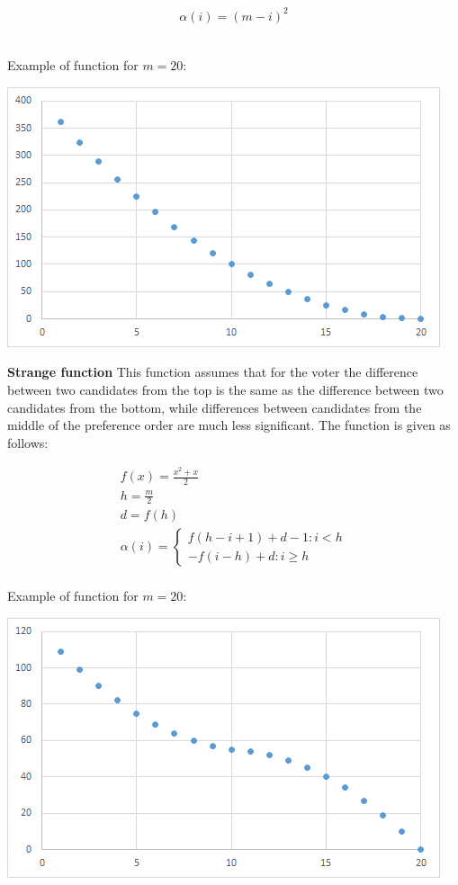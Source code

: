 \begin{gather}
	\alpha(i) = (m - i)^{2}
\end{gather}
\\

\newpage

Example of function for $m = 20$:

\begin{center}
	\includegraphics[scale=0.75]{satfun1}
\end{center}

\noindent
\textbf{Strange function} \hspace{.1in} This function assumes that for the voter the difference between two candidates from the top is the same as the difference between two candidates from the bottom, while differences between candidates from the middle of the preference order are much less significant. The function is given as follows:

\begin{gather}
	f(x) = \frac{x^{2}+x}{2} \\
	h = \frac{m}{2} \\
	d = f(h) \\
	\alpha(i) = \begin{cases} f(h-i+1)+d-1 : i<h \\ -f(i-h)+d : i \geq h \end{cases}
\end{gather}
\\

Example of function for $m = 20$:

\begin{center}
	\includegraphics[scale=0.75]{satfun2}
\end{center}

